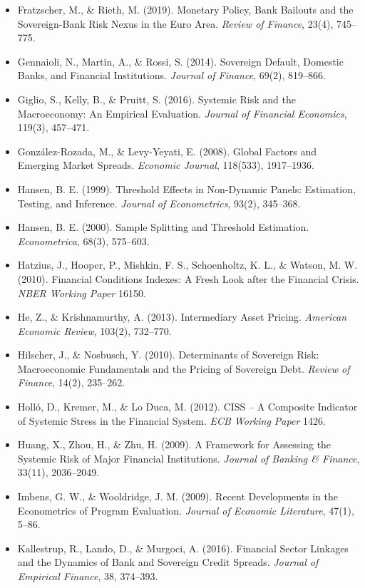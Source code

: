 \documentclass[5p,times,twocolumn,authoryear]{elsarticle}
\begin{document}
\begin{itemize}
    \item Fratzscher, M., \& Rieth, M. (2019). Monetary Policy, Bank Bailouts and the Sovereign-Bank Risk Nexus in the Euro Area. \textit{Review of Finance}, 23(4), 745–775.
    \item Gennaioli, N., Martin, A., \& Rossi, S. (2014). Sovereign Default, Domestic Banks, and Financial Institutions. \textit{Journal of Finance}, 69(2), 819–866.
    \item Giglio, S., Kelly, B., \& Pruitt, S. (2016). Systemic Risk and the Macroeconomy: An Empirical Evaluation. \textit{Journal of Financial Economics}, 119(3), 457–471.
    \item González-Rozada, M., \& Levy-Yeyati, E. (2008). Global Factors and Emerging Market Spreads. \textit{Economic Journal}, 118(533), 1917–1936.
    \item Hansen, B. E. (1999). Threshold Effects in Non-Dynamic Panels: Estimation, Testing, and Inference. \textit{Journal of Econometrics}, 93(2), 345–368.
    \item Hansen, B. E. (2000). Sample Splitting and Threshold Estimation. \textit{Econometrica}, 68(3), 575–603.
    \item Hatzius, J., Hooper, P., Mishkin, F. S., Schoenholtz, K. L., \& Watson, M. W. (2010). Financial Conditions Indexes: A Fresh Look after the Financial Crisis. \textit{NBER Working Paper} 16150.
    \item He, Z., \& Krishnamurthy, A. (2013). Intermediary Asset Pricing. \textit{American Economic Review}, 103(2), 732–770.
    \item Hilscher, J., \& Nosbusch, Y. (2010). Determinants of Sovereign Risk: Macroeconomic Fundamentals and the Pricing of Sovereign Debt. \textit{Review of Finance}, 14(2), 235–262.
    \item Holló, D., Kremer, M., \& Lo Duca, M. (2012). CISS – A Composite Indicator of Systemic Stress in the Financial System. \textit{ECB Working Paper} 1426.
    \item Huang, X., Zhou, H., \& Zhu, H. (2009). A Framework for Assessing the Systemic Risk of Major Financial Institutions. \textit{Journal of Banking \& Finance}, 33(11), 2036–2049.
    \item Imbens, G. W., \& Wooldridge, J. M. (2009). Recent Developments in the Econometrics of Program Evaluation. \textit{Journal of Economic Literature}, 47(1), 5–86.
    \item Kallestrup, R., Lando, D., \& Murgoci, A. (2016). Financial Sector Linkages and the Dynamics of Bank and Sovereign Credit Spreads. \textit{Journal of Empirical Finance}, 38, 374–393.

\end{itemize}
\end{document}
